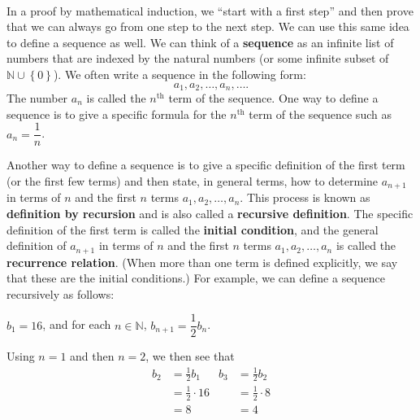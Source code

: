 \begin{previewactivity} \label{PA:recursivesequences} \hfill \\
In a proof by mathematical induction, we ``start with a first step'' and then prove that we can always go from one step to the next step.  We can use this same idea to define a sequence as well.  We can think of a \textbf{sequence}
%
 as an infinite list of numbers that are indexed by the natural numbers (or some infinite subset of  $\mathbb{N} \cup \left\{ 0 \right\}$).  We often write a sequence in the following form:
\[
a_1, a_2, \ldots,a_n, \ldots. 
\]
The number $a_n$ is called the $n^\text{th}$ term of the sequence.  One way to define a sequence is to give a specific formula for the $n^\text{th}$ term of the sequence such as 
$a_n = \dfrac{1}{n}$.

Another way to define a sequence is to  give a specific definition of the first term (or the first few terms) and then state, in general terms, how to determine  $a_{n + 1} $  in terms of  $n$  and the first  $n$  terms  $a_1 ,a_2 , \ldots ,a_n $.  This process is known as \textbf{definition by recursion} and is 
%
  also called a \textbf{recursive definition}.  \label{recursivedef}
%
The specific definition of the first term is called the \textbf{initial condition},
%
 and the general definition of  $a_{n + 1} $  in terms of  $n$  and the first  $n$  terms  $a_1 ,a_2 , \ldots ,a_n $ is called the \textbf{recurrence relation}.
%
  (When more than one term is defined explicitly, we say that these are the initial conditions.)  For example, we can define a sequence recursively as follows:
\begin{list}{}
\item $b_1  = 16$, and	for each  $n \in \mathbb{N}$,  $b_{n + 1}  = \dfrac{1}{2}b_n $.
\end{list}

\newpar
Using $n = 1$ and then $n = 2$, we then see that
\begin{align*}
b_2 &= \frac{1}{2} b_1 &    b_3 &= \frac{1}{2} b_2 \\
    &= \frac{1}{2} \cdot 16 &    &= \frac{1}{2} \cdot 8 \\
    &= 8                    &    &= 4
\end{align*}

\begin{enumerate}


\end{enumerate}
\end{previewactivity}
